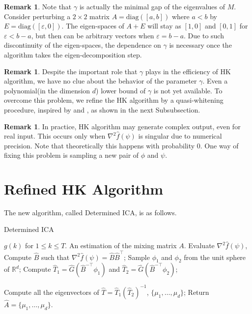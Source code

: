 \documentclass[twoside]{article}
\newcommand{\real}{\mathbb{R}}
\theoremstyle{definition}
\newtheorem{remark}[lemma]{Remark}
\newcommand{\eps}{\varepsilon}
\begin{document}
\begin{remark}
Note that $\gamma$ is actually the minimal gap of the eigenvalues of $M$.
Consider perturbing a $2\times 2$ matrix $A = \text{diag}([a,b])$ where $a<b$ by $E = \text{diag}([\eps,0])$. 
The eigen-spaces of $A+E$ will stay as $[1,0]$ and $[0,1]$ for $\eps < b-a$, but then can be arbitrary vectors when $\eps = b-a$.  
Due to such discontinuity of the eigen-spaces, the dependence on $\gamma$ is necessary once the algorithm takes the eigen-decomposition step. 
\end{remark}
\begin{remark}
Despite the important role that $\gamma$ plays in the efficiency of HK algorithm, we have no clue about the behavior of the parameter $\gamma$. Even a polynomial(in the dimension $d$) lower bound of $\gamma$ is not yet available. 
To overcome this problem, we refine the HK algorithm by a quasi-whitening procedure, inspired by \citep{arora2012provable} and \citep{frieze1996learning}, as shown in the next Subsubsection.
\end{remark}
\begin{remark}
In practice, HK algorithm may generate complex output, even for real input. This occurs only when $\nabla^2\widehat{f}(\psi)$ is singular due to numerical precision. Note that theoretically this happens with probability 0. One way of fixing this problem is sampling a new pair of $\phi$ and $\psi$.
\end{remark}

\section{Refined HK Algorithm}
\label{sec:DICA}
The new algorithm, called Determined ICA, is as follows. 
\begin{algorithm}[H]
\caption{Determined ICA}
\begin{algorithmic}[1]
\INPUT $g(k)$ for $1\le k \le T$. 
\OUTPUT An estimation of the mixing matrix $A$. 
\STATE Evaluate $\nabla^2\widehat{f}(\psi)$, \\
\STATE Compute $\widehat{B}$ such that $\nabla^2\widehat{f}(\psi) = \widehat{B}\widehat{B}^{\top}$;
\STATE Sample $\phi_1$ and $\phi_2$ from the unit sphere of $\real^d$;
\STATE Compute $\widehat{T}_1 = \widehat{G}(\widehat{B}^{-\top}\phi_1)$ and  $\widehat{T}_2 =\widehat{G}(\widehat{B}^{-\top}\phi_2)$;

\STATE Compute all the eigenvectors of $\widehat{T} = \widehat{T}_1\left(\widehat{T}_2\right)^{-1}$, $\{\mu_1,\ldots,\mu_d\}$;
\STATE Return $\widehat{A} = \{\mu_1,\ldots,\mu_d\}$.
\end{algorithmic}
\end{algorithm}
\end{document}

